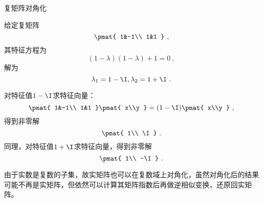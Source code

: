 \begin{example}{复矩阵对角化}

给定复矩阵
\begin{equation}
\pmat{
    1&-1\\
    1&1
}~, 
\end{equation}
其特征方程为
\begin{equation}
(1-\lambda)(1-\lambda)+1=0~, 
\end{equation}
解为
\begin{equation}
\lambda_1 = 1-\I, \lambda_2 = 1+\I~. 
\end{equation}

对特征值$1-\I$求特征向量：
\begin{equation}
\pmat{
    1&-1\\
    1&1
}
\pmat{
    x\\y
}
=
(1-\I)
\pmat{
    x\\y
}~, 
\end{equation}
得到非零解
\begin{equation}
\pmat{
1\\ \I
}~. 
\end{equation}
同理，对特征值$1+\I$求特征向量，得到非零解
\begin{equation}
\pmat{
1\\ -\I
}~. 
\end{equation}

\end{example}


由于实数是复数的子集，故实矩阵也可以在复数域上对角化，虽然对角化后的结果可能不再是实矩阵，但依然可以计算其矩阵指数后再做逆相似变换，还原回实矩阵。














